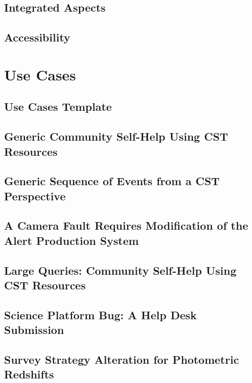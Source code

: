 \documentclass[DM,lsstdraft,authoryear,toc]{lsstdoc}
\begin{document}
\clearpage
\subsection{Integrated Aspects}


\clearpage
\subsection{Accessibility}


\clearpage
\section{Use Cases}

\clearpage
\subsection{Use Cases Template}


\clearpage
\subsection{Generic Community Self-Help Using CST Resources}


\clearpage
\subsection{Generic Sequence of Events from a CST Perspective}


\clearpage
\subsection{A Camera Fault Requires Modification of the Alert Production System}


\clearpage
\subsection{Large Queries: Community Self-Help Using CST Resources}


\clearpage
\subsection{Science Platform Bug: A Help Desk Submission}


\clearpage
\subsection{Survey Strategy Alteration for Photometric Redshifts}

\end{document}
